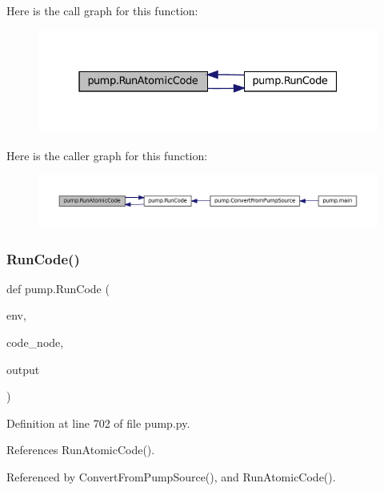 Here is the call graph for this function\+:
\nopagebreak
\begin{figure}[H]
\begin{center}
\leavevmode
\includegraphics[width=331pt]{namespacepump_a901e6abd34691a0d779178a615cc09c1_cgraph}
\end{center}
\end{figure}
Here is the caller graph for this function\+:
\nopagebreak
\begin{figure}[H]
\begin{center}
\leavevmode
\includegraphics[width=350pt]{namespacepump_a901e6abd34691a0d779178a615cc09c1_icgraph}
\end{center}
\end{figure}
\mbox{\label{namespacepump_ac6a714a44e28c2a19a1dfabeb9c9d4f1}} 
\subsubsection{\texorpdfstring{Run\+Code()}{RunCode()}}
{\footnotesize\ttfamily def pump.\+Run\+Code (\begin{DoxyParamCaption}\item[{}]{env,  }\item[{}]{code\+\_\+node,  }\item[{}]{output }\end{DoxyParamCaption})}



Definition at line 702 of file pump.\+py.



References Run\+Atomic\+Code().



Referenced by Convert\+From\+Pump\+Source(), and Run\+Atomic\+Code().


